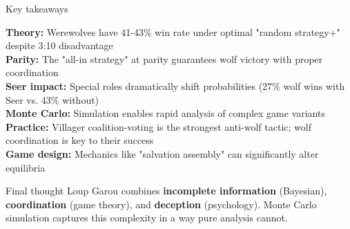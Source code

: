\documentclass[10pt]{beamer}
\begin{document}
\begin{frame}{Key takeaways}
  
  \textbf{Theory:} Werewolves have 41-43\% win rate under optimal "random strategy+" despite 3:10 disadvantage \\
    
  \textbf{Parity:} The "all-in strategy" at parity guarantees wolf victory with proper coordination \\
    
  \textbf{Seer impact:} Special roles dramatically shift probabilities (27\% wolf wins with Seer vs. 43\% without) \\
    
  \textbf{Monte Carlo:} Simulation enables rapid analysis of complex game variants \\
    
  \textbf{Practice:} Villager coalition-voting is the strongest anti-wolf tactic; wolf coordination is key to their success \\
    
  \textbf{Game design:} Mechanics like "salvation assembly" can significantly alter equilibria \\
  

  \begin{alertblock}{Final thought}
    Loup Garou combines \textbf{incomplete information} (Bayesian), \textbf{coordination} (game theory), and \textbf{deception} (psychology). Monte Carlo simulation captures this complexity in a way pure analysis cannot.
  \end{alertblock}
\end{frame}

    
\end{document}
